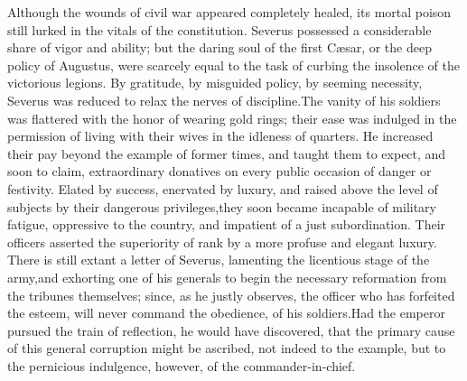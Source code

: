 

Although the wounds of civil war appeared completely healed, its
mortal poison still lurked in the vitals of the constitution.
Severus possessed a considerable share of vigor and ability; but
the daring soul of the first Cæsar, or the deep policy of
Augustus, were scarcely equal to the task of curbing the
insolence of the victorious legions. By gratitude, by misguided
policy, by seeming necessity, Severus was reduced to relax the
nerves of discipline.\footnotemark[63] The vanity of his soldiers was flattered
with the honor of wearing gold rings; their ease was indulged in
the permission of living with their wives in the idleness of
quarters. He increased their pay beyond the example of former
times, and taught them to expect, and soon to claim,
extraordinary donatives on every public occasion of danger or
festivity. Elated by success, enervated by luxury, and raised
above the level of subjects by their dangerous privileges,\footnotemark[64]
they soon became incapable of military fatigue, oppressive to the
country, and impatient of a just subordination. Their officers
asserted the superiority of rank by a more profuse and elegant
luxury. There is still extant a letter of Severus, lamenting the
licentious stage of the army,\footnotemark[641] and exhorting one of his
generals to begin the necessary reformation from the tribunes
themselves; since, as he justly observes, the officer who has
forfeited the esteem, will never command the obedience, of his
soldiers.\footnotemark[65] Had the emperor pursued the train of reflection, he
would have discovered, that the primary cause of this general
corruption might be ascribed, not indeed to the example, but to
the pernicious indulgence, however, of the commander-in-chief.




